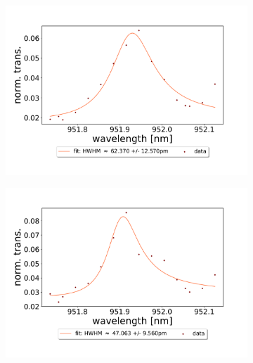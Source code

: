\begin{figure}[h!]
\begin{subfigure}[b]{0.49\textwidth}
        \includegraphics[width=\textwidth]{figures/results/double fano fits/20250326/83um_M3:M5_fit_9.pdf}
        \caption{}
        \label{fig:83um_M3:M5_fit_9}
    \end{subfigure}
    \begin{subfigure}[b]{0.49\textwidth}
        \includegraphics[width=\textwidth]{figures/results/double fano fits/20250326/83um_M3:M5_fit_10.pdf}
        \caption{}
        \label{fig:83um_M3:M5_fit_10}
    \end{subfigure}
    \begin{subfigure}[b]{0.49\textwidth}

\end{subfigure}
\end{figure}
